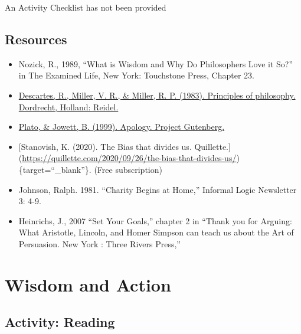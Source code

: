 \documentclass[
]{book}
\providecommand{\tightlist}{%
  \setlength{\itemsep}{0pt}\setlength{\parskip}{0pt}}
\begin{document}
{An Activity Checklist has not been provided}

\hypertarget{resources}{%
\subsection*{Resources}\label{resources}}

\begin{itemize}
\tightlist
\item
  Nozick, R., 1989, ``What is Wisdom and Why Do Philosophers Love it So?'' in The Examined Life, New York: Touchstone Press, Chapter 23.\\
\item
  \href{https://www.earlymoderntexts.com/assets/pdfs/descartes1644part1.pdf}{Descartes, R., Miller, V. R., \& Miller, R. P. (1983). Principles of philosophy. Dordrecht, Holland: Reidel.}\\
\item
  \href{https://twu.idm.oclc.org/login?url=https://search.ebscohost.com/login.aspx?direct=true\&db=nlebk\&AN=1085368\&site=eds-live\&scope=site\&ebv=EB\&ppid=pp_1}{Plato, \& Jowett, B. (1999). Apology. Project Gutenberg.}\\
\item
  {[}Stanovish, K. (2020). The Bias that divides us. Quillette.{]} (\url{https://quillette.com/2020/09/26/the-bias-that-divides-us/})\{target=``\_blank''\}. (Free subscription)\\
\item
  Johnson, Ralph. 1981. ``Charity Begins at Home,'' Informal Logic Newsletter 3: 4-9.\\
\item
  Heinrichs, J., 2007 ``Set Your Goals,'' chapter 2 in ``Thank you for Arguing: What Aristotle, Lincoln, and Homer Simpson can teach us about the Art of Persuasion. New York : Three Rivers Press,''
\end{itemize}

\hypertarget{wisdom-and-action}{%
\section{Wisdom and Action}\label{wisdom-and-action}}

\hypertarget{activity-reading}{%
\subsection*{Activity: Reading}\label{activity-reading}}
\end{document}

